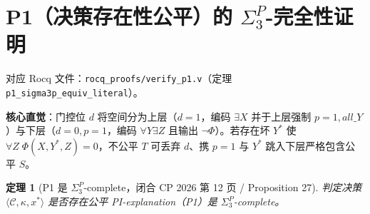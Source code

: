 \documentclass[11pt,a4paper]{article}
\newtheorem{theorem}{定理}[section]
\newcommand{\C}{\mathcal{C}}
\newcommand{\code}[1]{\texttt{\small #1}}
\begin{document}
\section{P1（决策存在性公平）的 \texorpdfstring{$\Sigma_3^P$}{Sigma\_3\^{}P}-完全性证明}
对应 Rocq 文件：\code{rocq\_proofs/verify\_p1.v}（定理 \code{p1\_sigma3p\_equiv\_literal}）。

\textbf{核心直觉}：门控位 $d$ 将空间分为上层（$d=1$，编码 $\exists X$ 并于上层强制 $p=1, all\_Y$）与下层（$d=0,p=1$，编码 $\forall Y \exists Z$ 且输出 $\neg\Phi$）。若存在坏 $Y^*$ 使 $\forall Z\;\Phi(X,Y^*,Z)=0$，不公平 $T$ 可丢弃 $d$、携 $p=1$ 与 $Y^*$ 跳入下层严格包含公平 $S$。

\begin{theorem}[P1 是 $\Sigma_3^P$-complete，闭合 CP 2026 第 12 页 / Proposition 27]
判定决策 $\langle \C, \kappa, x^* \rangle$ 是否存在公平 PI-explanation（P1）是 $\Sigma_3^P$-complete。
\end{theorem}
\end{document}
